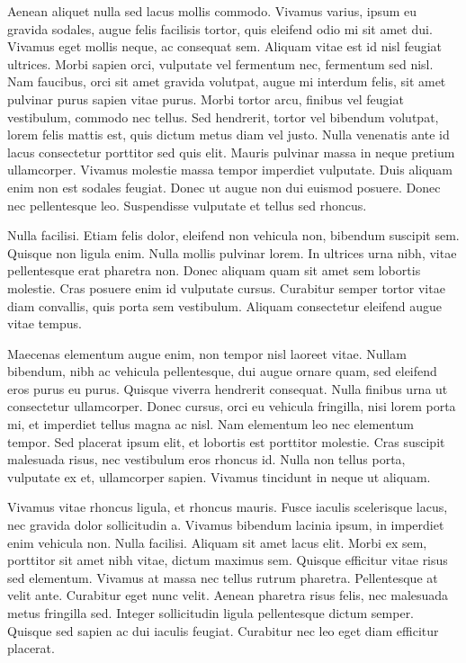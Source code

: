 Aenean aliquet nulla sed lacus mollis commodo. Vivamus varius, ipsum eu gravida sodales, augue felis facilisis tortor, quis eleifend odio mi sit amet dui. Vivamus eget mollis neque, ac consequat sem. Aliquam vitae est id nisl feugiat ultrices. Morbi sapien orci, vulputate vel fermentum nec, fermentum sed nisl. Nam faucibus, orci sit amet gravida volutpat, augue mi interdum felis, sit amet pulvinar purus sapien vitae purus. Morbi tortor arcu, finibus vel feugiat vestibulum, commodo nec tellus. Sed hendrerit, tortor vel bibendum volutpat, lorem felis mattis est, quis dictum metus diam vel justo. Nulla venenatis ante id lacus consectetur porttitor sed quis elit. Mauris pulvinar massa in neque pretium ullamcorper. Vivamus molestie massa tempor imperdiet vulputate. Duis aliquam enim non est sodales feugiat. Donec ut augue non dui euismod posuere. Donec nec pellentesque leo. Suspendisse vulputate et tellus sed rhoncus.

Nulla facilisi. Etiam felis dolor, eleifend non vehicula non, bibendum suscipit sem. Quisque non ligula enim. Nulla mollis pulvinar lorem. In ultrices urna nibh, vitae pellentesque erat pharetra non. Donec aliquam quam sit amet sem lobortis molestie. Cras posuere enim id vulputate cursus. Curabitur semper tortor vitae diam convallis, quis porta sem vestibulum. Aliquam consectetur eleifend augue vitae tempus.

Maecenas elementum augue enim, non tempor nisl laoreet vitae. Nullam bibendum, nibh ac vehicula pellentesque, dui augue ornare quam, sed eleifend eros purus eu purus. Quisque viverra hendrerit consequat. Nulla finibus urna ut consectetur ullamcorper. Donec cursus, orci eu vehicula fringilla, nisi lorem porta mi, et imperdiet tellus magna ac nisl. Nam elementum leo nec elementum tempor. Sed placerat ipsum elit, et lobortis est porttitor molestie. Cras suscipit malesuada risus, nec vestibulum eros rhoncus id. Nulla non tellus porta, vulputate ex et, ullamcorper sapien. Vivamus tincidunt in neque ut aliquam.

Vivamus vitae rhoncus ligula, et rhoncus mauris. Fusce iaculis scelerisque lacus, nec gravida dolor sollicitudin a. Vivamus bibendum lacinia ipsum, in imperdiet enim vehicula non. Nulla facilisi. Aliquam sit amet lacus elit. Morbi ex sem, porttitor sit amet nibh vitae, dictum maximus sem. Quisque efficitur vitae risus sed elementum. Vivamus at massa nec tellus rutrum pharetra. Pellentesque at velit ante. Curabitur eget nunc velit. Aenean pharetra risus felis, nec malesuada metus fringilla sed. Integer sollicitudin ligula pellentesque dictum semper. Quisque sed sapien ac dui iaculis feugiat. Curabitur nec leo eget diam efficitur placerat.

